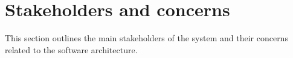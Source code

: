 \section{Stakeholders and concerns}
	This section outlines the main stakeholders of the system and their concerns related to the software architecture.
	